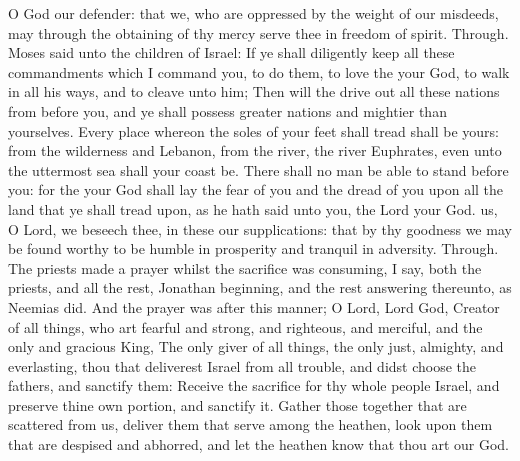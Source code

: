 \collect
{} O God our defender: that we, who are oppressed by the weight of our misdeeds, may through the obtaining of thy mercy serve thee in freedom of spirit. Through.
 Moses said unto the children of Israel: If ye shall diligently keep all these commandments which I command you, to do them, to love the  your God, to walk in all his ways, and to cleave unto him; Then will the  drive out all these nations from before you, and ye shall possess greater nations and mightier than yourselves. Every place whereon the soles of your feet shall tread shall be yours: from the wilderness and Lebanon, from the river, the river Euphrates, even unto the uttermost sea shall your coast be. There shall no man be able to stand before you: for the  your God shall lay the fear of you and the dread of you upon all the land that ye shall tread upon, as he hath said unto you, the Lord your God.
\collect
{} us, O Lord, we beseech thee, in these our supplications: that by thy goodness we may be found worthy to be humble in prosperity and tranquil in adversity. Through.
 The priests made a prayer whilst the sacrifice was consuming, I say, both the priests, and all the rest, Jonathan beginning, and the rest answering thereunto, as Neemias did. And the prayer was after this manner; O Lord, Lord God, Creator of all things, who art fearful and strong, and righteous, and merciful, and the only and gracious King, The only giver of all things, the only just, almighty, and everlasting, thou that deliverest Israel from all trouble, and didst choose the fathers, and sanctify them: Receive the sacrifice for thy whole people Israel, and preserve thine own portion, and sanctify it. Gather those together that are scattered from us, deliver them that serve among the heathen, look upon them that are despised and abhorred, and let the heathen know that thou art our God.
